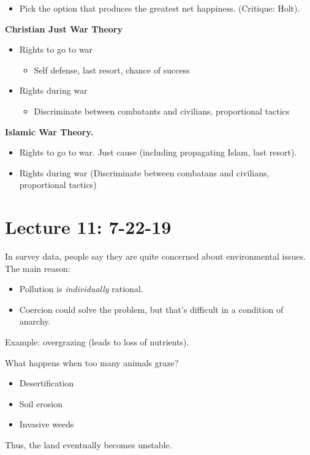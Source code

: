 \documentclass{article}
\begin{document}
\begin{itemize}
  \item Pick the option that produces the greatest net happiness. (Critique: Holt).
\end{itemize}

{\bf Christian Just War Theory}

\begin{itemize}
  \item Rights to go to war
    \begin{itemize}
      \item Self defense, last resort, chance of success
    \end{itemize}
  \item Rights during war
    \begin{itemize}
      \item Discriminate between combatants and civilians, proportional tactics
    \end{itemize}
\end{itemize}

{\bf Islamic War Theory.}

  \begin{itemize}
    \item Rights to go to war.  Just cause (including propagating Islam, last resort).
    \item Rights during war (Discriminate between combatans and civilians, proportional tactics)
  \end{itemize}

  \section{Lecture 11: 7-22-19}

  In survey data, people say they are quite concerned about environmental issues.  The main reason:

  \begin{itemize}
    \item Pollution is {\it individually} rational.
    \item Coercion could solve the problem, but that's difficult in a condition of anarchy.
  \end{itemize}

  Example: overgrazing (leads to loss of nutrients).

  What happens when too many animals graze?

  \begin{itemize}
    \item Desertification
    \item Soil erosion
    \item Invasive weeds
  \end{itemize}
  Thus, the land eventually becomes unstable.
\end{document}
